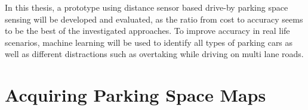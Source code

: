 \begin{table}

\caption{Machine learning models used to detect a city's parking space availability.}
\label{table:comparison_ml_approaches}
\end{table}


In this thesis, a prototype using distance sensor based drive-by parking space sensing will be developed and evaluated, as the ratio from cost to accuracy seems to be the best of the investigated approaches. To improve accuracy in real life scenarios, machine learning will be used to identify all types of parking cars as well as different distractions such as overtaking while driving on multi lane roads. 



\section{Acquiring Parking Space Maps}
\label{sec:acquiring_parking_space_maps}

